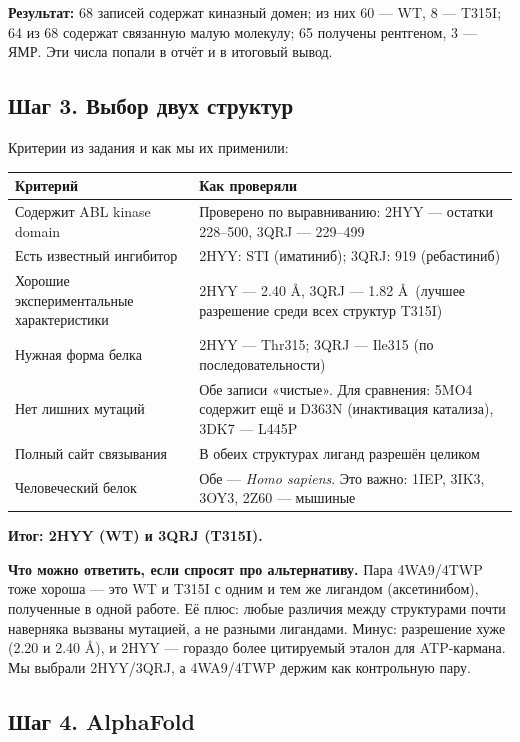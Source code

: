 \documentclass[11pt,a4paper]{article}
\begin{document}
\textbf{Результат:} 68 записей содержат киназный домен; из них 60 --- WT, 8 ---
T315I; 64 из 68 содержат связанную малую молекулу; 65 получены рентгеном, 3 --- ЯМР.
Эти числа попали в отчёт и в итоговый вывод.

\subsection{Шаг 3. Выбор двух структур}

Критерии из задания и как мы их применили:

\begin{center}
\small
\begin{tabular}{L{5.2cm}L{9.4cm}}
\toprule
\textbf{Критерий} & \textbf{Как проверяли} \\
\midrule
Содержит ABL kinase domain & Проверено по выравниванию: 2HYY --- остатки 228--500, 3QRJ --- 229--499 \\
Есть известный ингибитор & 2HYY: STI (иматиниб); 3QRJ: 919 (ребастиниб) \\
Хорошие экспериментальные характеристики & 2HYY --- 2.40 \AA, 3QRJ --- 1.82 \AA\ (лучшее разрешение среди всех структур T315I) \\
Нужная форма белка & 2HYY --- Thr315; 3QRJ --- Ile315 (по последовательности) \\
Нет лишних мутаций & Обе записи «чистые». Для сравнения: 5MO4 содержит ещё и D363N (инактивация катализа), 3DK7 --- L445P \\
Полный сайт связывания & В обеих структурах лиганд разрешён целиком \\
Человеческий белок & Обе --- \emph{Homo sapiens}. Это важно: 1IEP, 3IK3, 3OY3, 2Z60 --- мышиные \\
\bottomrule
\end{tabular}
\end{center}

\textbf{Итог: 2HYY (WT) и 3QRJ (T315I).}

\textbf{Что можно ответить, если спросят про альтернативу.} Пара 4WA9/4TWP тоже
хороша --- это WT и T315I с одним и тем же лигандом (аксетинибом), полученные в
одной работе. Её плюс: любые различия между структурами почти наверняка вызваны
мутацией, а не разными лигандами. Минус: разрешение хуже (2.20 и 2.40 \AA), и
2HYY --- гораздо более цитируемый эталон для ATP-кармана. Мы выбрали 2HYY/3QRJ,
а 4WA9/4TWP держим как контрольную пару.

\subsection{Шаг 4. AlphaFold}
\end{document}

